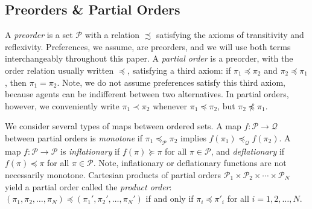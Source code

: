 \documentclass[conference]{ieeeconf}
\renewcommand{\preceq}{\preccurlyeq}
\renewcommand{\succeq}{\succcurlyeq}
\renewcommand{\P}{\mathcal{P}}
\newcommand{\Q}{\mathcal{Q}}
\newcommand{\lattice}{\mathcal{L}}
\DeclareMathOperator{\Fix}{Fix}
\DeclareMathOperator{\Pre}{Prefix}
\DeclareMathOperator{\Post}{Suffix}
\DeclareMathOperator{\lfp}{lfp}
\DeclareMathOperator{\gfp}{gfp}
\newtheorem{lemma}{Lemma}
\begin{document}
\vspace{-0.25em}
\subsection{Preorders \& Partial Orders}
\vspace{-0.25em}

A \emph{preorder} is a set $\P$ with a relation $\precsim$ satisfying the axioms of transitivity and reflexivity. Preferences, we assume, are preorders, and we will use both terms interchangeably throughout this paper. A \emph{partial order} is a preorder, with the order relation usually written $\preceq$, satisfying a third axiom: if $\pi_1 \preceq \pi_2$ and $\pi_2 \preceq \pi_1$, then $\pi_1 = \pi_2$. Note, we do not assume preferences satisfy this third axiom, because agents can be indifferent between two alternatives. In partial orders, however, we conveniently write $\pi_1 \prec \pi_2$ whenever $\pi_1 \preceq \pi_2$, but $\pi_2 \not \preceq \pi_1$.

We consider several types of maps between ordered sets. A map $f: \P \to \Q$ between partial orders is \emph{monotone} if $\pi_1 \preceq_{\P} \pi_2$ implies $f(\pi_1) \preceq_{\Q} f(\pi_2)$. A map $f: \P \to \P$ is \emph{inflationary} if $f(\pi) \succeq \pi$ for all $\pi \in \P$, and \emph{deflationary} if $f(\pi) \preceq \pi$ for all $\pi \in \P$. Note, inflationary or deflationary functions are not necessarily monotone.
Cartesian products of partial orders $\P_1 \times \P_2 \times \cdots \times \P_N$ yield a partial order called the \emph{product order}: $(\pi_1, \pi_2, \dots, \pi_N) \preceq (\pi_1', \pi_2', \dots, \pi_N')$ if and only if $\pi_i \preceq \pi'_i$ for all $i = 1,2,\dots, N$. 

\end{document}
